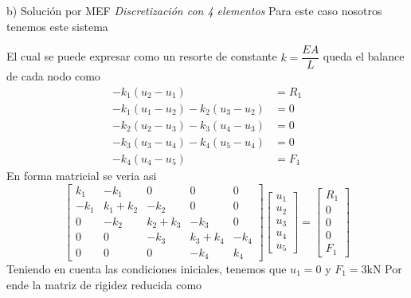 \begin{desarrollo}{b) Soluci\'on por MEF}
    \textit{Discretizaci\'on con 4 elementos}
    Para este caso nosotros tenemos este sistema
 \begin{center}
\label{fig:malla4}
\end{center}
El cual se puede expresar como un resorte de constante $k=\dfrac{EA}{L}$
queda el balance de cada nodo como
\begin{align*}
    -k_1(u_2-u_1)&=R_1\\
    -k_1(u_1-u_2)-k_2(u_3-u_2)&=0\\
    -k_2(u_2-u_3)-k_3(u_4-u_3)&=0\\
    -k_3(u_3-u_4)-k_4(u_5-u_4)&=0\\
    -k_4(u_4-u_5)&=F_1
\end{align*}
En forma matricial se veria asi
$$\begin{bmatrix}
    k_1&-k_1&0&0&0\\
    -k_1&k_1+k_2&-k_2&0&0\\
    0&-k_2&k_2+k_3&-k_3&0\\
    0&0&- k_3&k_3+k_4&-k_4\\
    0&0&0&-k_4&k_4
    
\end{bmatrix}\begin{bmatrix}
    u_1\\
    u_2\\
    u_3\\
    u_4\\
    u_5
\end{bmatrix}=\begin{bmatrix}
    R_1\\
    0\\
    0\\
    0\\
    F_1
\end{bmatrix}$$
Teniendo en cuenta las condiciones iniciales, tenemos que $u_1=0$ y $F_1=3\text{kN}$
Por ende la matriz de rigidez reducida como\\


\end{desarrollo}
